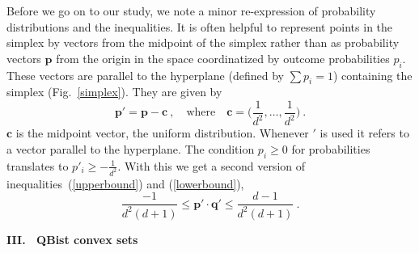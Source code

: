 \documentclass[letterpaper,11pt]{article}
\begin{document}
Before we go on to our study, we note a minor re-expression of probability distributions and the inequalities. It is often helpful to represent points in the simplex by vectors from the midpoint of the simplex rather than as probability vectors $\mathbf{p}$ from the origin in the space coordinatized by outcome probabilities $p_i$. These vectors are parallel to the hyperplane (defined by $\sum p_i=1$) containing the simplex (Fig.~\ref{simplex}). They are given by
%
\begin{equation}
  \mathbf{p' = p - c} \ , \quad \textrm{where} \quad
  \textstyle{
  \mathbf{c} =\big(\frac{1}{d^2},\dots, \frac{1}{d^2}\big)} \ .
\end{equation}
%
$\mathbf{c}$ is the midpoint vector, the uniform distribution. Whenever $'$ is used it refers to a vector parallel to the hyperplane. The condition $p_i\geq 0$ for probabilities translates to $p'_i\geq -\frac{1}{d^2}$. With this we get a second version of inequalities~(\ref{upperbound}) and (\ref{lowerbound}),
%
\begin{equation} \label{primedinequality}
   \frac{-1}{d^2(d+1)} \leq \mathbf{p'\cdot q'} \leq \frac{d-1}{d^2(d+1)} \ .
\end{equation}
%



\begin{center}\vspace{2mm}
  {\Large \bf III. \ QBist convex sets}
\end{center}\vspace{2mm}
\end{document}
